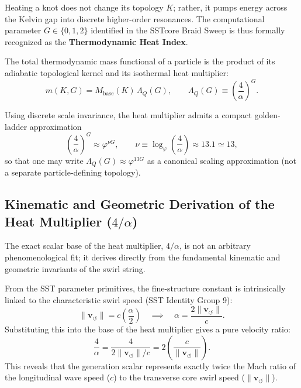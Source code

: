 \documentclass[11pt, a4paper]{article}
\newcommand{\vswirl}{\mathbf{v}_{\!\boldsymbol{\circlearrowleft}}}
\newcommand{\goldenratio}{\varphi}
\newcommand{\alphafs}{\alpha}
\begin{document}
            Heating a knot does not change its topology $K$; rather, it pumps energy across the Kelvin gap into discrete higher-order resonances. The computational parameter $G \in \{0, 1, 2\}$ identified in the SSTcore Braid Sweep is thus formally recognized as the \textbf{Thermodynamic Heat Index}.
            
            The total thermodynamic mass functional of a particle is the product of its adiabatic topological kernel and its isothermal heat multiplier:
            \begin{equation}
                m(K, G) = M_{\text{base}}(K)\,\Lambda_Q(G),
                \qquad
                \Lambda_Q(G)\equiv \left(\frac{4}{\alphafs}\right)^G.
            \end{equation}
            
            Using discrete scale invariance, the heat multiplier admits a compact golden-ladder approximation
            \begin{equation}
                \left(\frac{4}{\alphafs}\right)^G \approx \goldenratio^{\nu G},
                \qquad
                \nu \equiv \log_{\goldenratio}\!\left(\frac{4}{\alphafs}\right)\approx 13.1 \simeq 13,
            \end{equation}
            so that one may write $\Lambda_Q(G)\approx \goldenratio^{13G}$ as a canonical scaling approximation (not a separate particle-defining topology).
            
            \subsection{Kinematic and Geometric Derivation of the Heat Multiplier ($4/\alphafs$)}
                \label{sec:derivation_4alpha}
                
                The exact scalar base of the heat multiplier, $4/\alphafs$, is not an arbitrary phenomenological fit; it derives directly from the fundamental kinematic and geometric invariants of the swirl string.
                
                From the SST parameter primitives, the fine-structure constant is intrinsically linked to the characteristic swirl speed (SST Identity Group 9):
                \begin{equation}
                    \lVert \vswirl \rVert = c \left( \frac{\alphafs}{2} \right) \quad \implies \quad \alphafs = \frac{2 \lVert \vswirl \rVert}{c}.
                \end{equation}
                Substituting this into the base of the heat multiplier gives a pure velocity ratio:
                \begin{equation}
                    \frac{4}{\alphafs} = \frac{4}{2 \lVert \vswirl \rVert / c} = 2 \left( \frac{c}{\lVert \vswirl \rVert} \right).
                \end{equation}
                This reveals that the generation scalar represents exactly twice the Mach ratio of the longitudinal wave speed ($c$) to the transverse core swirl speed ($\lVert \vswirl \rVert$).
                
\end{document}
